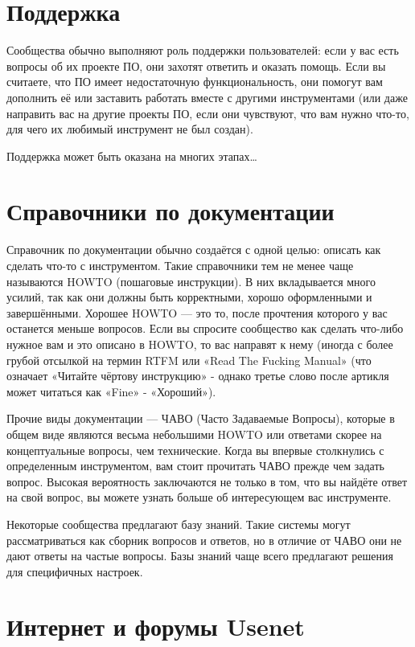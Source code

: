 \documentclass[10pt]{book}
\begin{document}
\section{Поддержка}

Сообщества обычно выполняют роль поддержки пользователей: если у вас есть вопросы об их проекте ПО, они захотят ответить и оказать помощь. Если вы считаете, что ПО имеет недостаточную функциональность, они помогут вам дополнить её или заставить работать вместе с другими инструментами (или даже направить вас на другие проекты ПО, если они чувствуют, что вам нужно что-то, для чего их любимый инструмент не был создан).

Поддержка может быть оказана на многих этапах\ldots

\section{Справочники по документации}

Справочник по документации обычно создаётся с одной целью: описать как сделать что-то с инструментом. Такие справочники тем не менее чаще называются HOWTO (пошаговые инструкции). В них вкладывается много усилий, так как они должны быть корректными, хорошо оформленными и завершёнными. Хорошее HOWTO — это то, после прочтения которого у вас останется меньше вопросов.  Если вы спросите сообщество как сделать что-либо нужное вам и это описано в HOWTO, то вас направят к нему (иногда с более грубой отсылкой на термин RTFM или «Read The Fucking Manual» (что означает «Читайте чёртову инструкцию» - однако третье слово после артикля может читаться как «Fine» - «Хороший»).

Прочие виды документации — ЧАВО (Часто Задаваемые Вопросы), которые в общем виде являются весьма небольшими HOWTO или ответами скорее на концептуальные вопросы, чем технические. Когда вы впервые столкнулись с определенным инструментом, вам стоит прочитать ЧАВО прежде чем задать вопрос. Высокая вероятность заключаются не только в том, что вы найдёте ответ на свой вопрос, вы можете узнать больше об интересующем вас инструменте. 

Некоторые сообщества предлагают базу знаний. Такие системы могут рассматриваться как сборник вопросов и ответов, но в отличие от ЧАВО они не дают ответы на частые вопросы. Базы знаний чаще всего предлагают решения для специфичных настроек. 

\section{Интернет и форумы Usenet}
\end{document}
